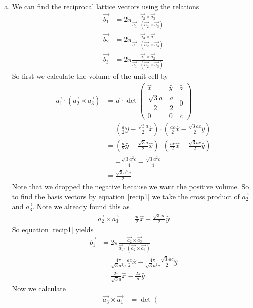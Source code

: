 \documentclass[11pt]{article}
\numberwithin{equation}{section}
\begin{document}
\begin{enumerate}[(a)]
\item
We can find the reciprocal lattice vectors using the relations
\begin{align}
\label{recip1}
\vec{b_1} &= 2\pi\frac{\vec{a_2}\times\vec{a_3}}{\vec{a_1}\cdot(\vec{a_2}\times\vec{a_3})}\\
\label{recip2}
\vec{b_2} &= 2\pi\frac{\vec{a_3}\times\vec{a_1}}{\vec{a_1}\cdot(\vec{a_2}\times\vec{a_3})}\\
\label{recip3}
\vec{b_3} &= 2\pi\frac{\vec{a_1}\times\vec{a_2}}{\vec{a_1}\cdot(\vec{a_2}\times\vec{a_3})}
\end{align}
So first we calculate the volume of the unit cell by
\begin{align*}
\vec{a_1}\cdot(\vec{a_2}\times\vec{a_3}) &= \vec{a}\cdot
			\det\left(\begin{array}{ccc}
			\hat{x}			&\hat{y}	&\hat{z}\\
			\dfrac{\sqrt{3}a}{2}	&\dfrac{a}{2}	&0\\
			0			&0		&c
			\end{array}\right)\\
&= \left(\frac{a}{2}\hat{y} - \frac{\sqrt{3}a}{2}\hat{x}\right)\cdot\left(\frac{ac}{2}\hat{x} - \frac{\sqrt{3}ac}{2}\hat{y}\right)\\
&= \left(\frac{a}{2}\hat{y} - \frac{\sqrt{3}a}{2}\hat{x}\right)\cdot\left(\frac{ac}{2}\hat{x} - \frac{\sqrt{3}ac}{2}\hat{y}\right)\\
&= -\frac{\sqrt{3}a^2c}{4} - \frac{\sqrt{3}a^2c}{4}\\
&= \frac{\sqrt{3}a^2c}{2}
\end{align*}
Note that we dropped the negative because we want the positive volume. So to find the basis vectors by equation \ref{recip1} we take the cross product of $\vec{a_2}$ and $\vec{a_3}$. Note we already found this as
\begin{align*}
\vec{a_2}\times\vec{a_3} &= \frac{ac}{2}\hat{x} - \frac{\sqrt{3}ac}{2}\hat{y}
\end{align*}
So equation \ref{recip1} yields
\begin{align*}
\vec{b_1} &= 2\pi\frac{\vec{a_2}\times\vec{a_3}}{\vec{a_1}\cdot(\vec{a_2}\times\vec{a_3})}\\
&= \frac{4\pi}{\sqrt{3}a^2c}\frac{ac}{2}\hat{x} - \frac{4\pi}{\sqrt{3}a^2c}\frac{\sqrt{3}ac}{2}\hat{y}\\
&= \frac{2\pi}{\sqrt{3}a}\hat{x} - \frac{2\pi}{a}\hat{y}
\end{align*}
Now we calculate
\begin{align*}
\vec{a_3}\times\vec{a_1} &= \det\left(\begin{array}{ccc}

\end{array}
\end{align*}
\end{enumerate}
\end{document}
